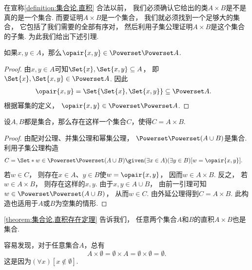 在宣称\cref{definition:集合论.直积} 合法以前，
我们必须确认它给出的类\(A \times B\)是不是真的是一个集合.
而要证明\(A \times B\)是一个集合，
我们就必须找到一个足够大的集合，
它包括了我们需要的全部有序对，
然后利用子集公理证明\(A \times B\)是这个集合的子集.
为此我们给出下述引理.
\begin{lemma}\label{theorem:集合论.有序对是其坐标元素所在集合的二重幂集的元素}
    如果\(x,y \in A\)，那么\(\opair{x,y} \in \Powerset\Powerset A\).
    \begin{proof}
        由\(x,y\in A\)可知\(\Set{x},\Set{x,y}\subseteq A\)，
        即\(\Set{x},\Set{x,y}\in\Powerset A\).
        因此
        \begin{align*}
            \opair{x,y}
            &= \Set{\Set{x},\Set{x,y}}
            \subseteq\Powerset A.
        \end{align*}
        根据幂集的定义，
        \(\opair{x,y}\in\Powerset\Powerset A\).
    \end{proof}
\end{lemma}

\begin{theorem}\label{theorem:集合论.直积存在定理}
    设\(A,B\)都是集合，那么存在这样一个集合\(C\)，使得\(C = A \times B\).
    \begin{proof}
        由配对公理、并集公理和幂集公理，
        \(\Powerset\Powerset(A\cup B)\)是集合.
        利用子集公理构造
        \begin{align*}
            C
            &= \Set*{w\in\Powerset\Powerset(A\cup B)
            \given (\exists x\in A)(\exists y\in B)[w=\opair{x,y}]}.
        \end{align*}
        若\(w\in C\)，
        则存在\(x\in A\)、\(y\in B\)使\(w=\opair{x,y}\)，
        因而\(w\in A\times B\).
        反之，
        若\(w\in A\times B\)，
        则存在这样的\(x,y\).
        由于\(x,y\in A\cup B\)，
        由前一引理可知\(w\in\Powerset\Powerset(A\cup B)\)，
        从而\(w\in C\).
        由外延公理得到\(C=A\times B\).
        此构造也适用于\(A\)或\(B\)为空集的情形.
    \end{proof}
\end{theorem}
\cref{theorem:集合论.直积存在定理} 告诉我们，
任意两个集合\(A\)和\(B\)的直积\(A \times B\)也是集合.

容易发现，对于任意集合\(A\)，总有
\begin{equation}
    A \times \emptyset
    = \emptyset \times A
    = \emptyset \times \emptyset
    = \emptyset.
\end{equation}
这是因为\((\forall x)[x \notin \emptyset]\).

